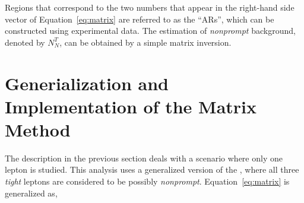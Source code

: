Regions that correspond to the two numbers that appear in the right-hand side vector of Equation~\ref{eq:matrix} are referred to as the ``\acp{AR}'', which can be constructed using experimental data. The estimation of \emph{nonprompt} background, denoted by $N_{N}^T$, can be obtained by a simple matrix inversion. 

\section{Generialization and Implementation of the Matrix Method}
\label{sec:MR}

The description in the previous section deals with a scenario where only one lepton is studied. This analysis uses a generalized version of the \mm, where all three \emph{tight} leptons are considered to be possibly \emph{nonprompt}. Equation~\ref{eq:matrix} is generalized as,

